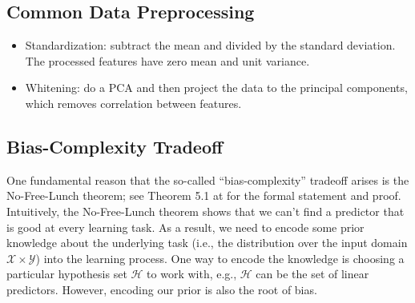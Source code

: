 \subsection{Common Data Preprocessing}
    \begin{itemize}
        \item Standardization: subtract the mean and divided by the standard deviation. The processed features have zero mean and unit variance.
        \item Whitening: do a PCA and then project the data to the principal components, which removes correlation between features. 
    \end{itemize}
    


\subsection{Bias-Complexity Tradeoff}
One fundamental reason that the so-called ``bias-complexity'' tradeoff arises is the No-Free-Lunch theorem; see Theorem 5.1 at \cite{shalev2014understanding} for the formal statement and proof.
Intuitively, the No-Free-Lunch theorem shows that we can't find a predictor that is good at every learning task. 
As a result, we need to encode some prior knowledge about the underlying task (i.e., the distribution over the input domain $\mathcal{X} \times \mathcal{Y}$) into the learning process.
One way to encode the knowledge is choosing a particular hypothesis set $\mathcal{H}$ to work with, e.g., $\mathcal{H}$ can be the set of linear predictors.
However, encoding our prior is also the root of bias.

